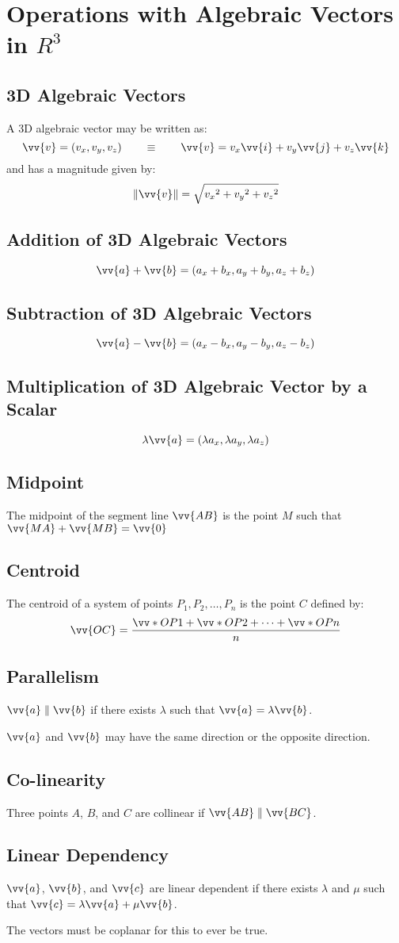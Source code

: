 	\section{Operations with Algebraic Vectors in $R^3$}
		\subsection{3D Algebraic Vectors}
			A 3D algebraic vector may be written as:
			\[\vv{v} = (v_x, v_y, v_z) \qquad \equiv \qquad \vv{v} = v_x\vv{i} + v_y\vv{j} + v_z\vv{k}\]
			and has a magnitude given by:
			\[\|\vv{v}\| = \sqrt{{v_x}^2 + {v_y}^2 + {v_z}^2}\]
		\subsection{Addition of 3D Algebraic Vectors}
			\[\vv{a} + \vv{b} = (a_x + b_x, a_y + b_y, a_z + b_z)\]
		\subsection{Subtraction of 3D Algebraic Vectors}
			\[\vv{a} - \vv{b} = (a_x - b_x, a_y - b_y, a_z - b_z)\]
		\subsection{Multiplication of 3D Algebraic Vector by a Scalar}
			\[\lambda\vv{a} = (\lambda a_x, \lambda a_y, \lambda a_z)\]
		\subsection{Midpoint}
			The midpoint of the segment line $\vv{AB}$ is the point $M$ such that $\vv{MA} + \vv{MB} = \vv{0}$
		\subsection{Centroid}
			The centroid of a system of points $P_1, P_2, \dots, P_n$ is the point $C$ defined by:
			\[\vv{OC} = \frac{\vv*{OP}{1} + \vv*{OP}{2} + \dots + \vv*{OP}{n}}{n}\]
		\subsection{Parallelism}
			$\vv{a} \parallel \vv{b}$ if there exists $\lambda$ such that $\vv{a} = \lambda\vv{b}$.

			$\vv{a}$ and $\vv{b}$ may have the same direction or the opposite direction.
		\subsection{Co-linearity}
			Three points $A$, $B$, and $C$ are collinear if $\vv{AB} \parallel \vv{BC}$.
		\subsection{Linear Dependency}
			$\vv{a}$, $\vv{b}$, and $\vv{c}$ are linear dependent if there exists $\lambda$ and $\mu$ such that $\vv{c} = \lambda\vv{a} + \mu\vv{b}$.

			The vectors must be coplanar for this to ever be true.
